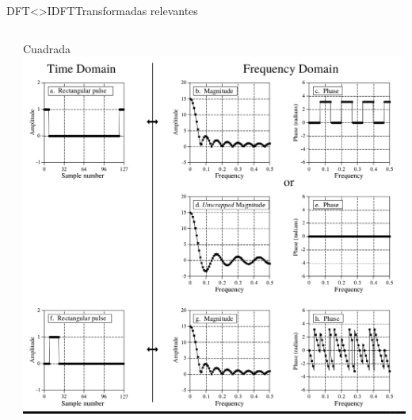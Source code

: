 \begin{frame}{DFT<>IDFT}{Transformadas relevantes}
\begin{columns}[c]
\begin{column}{.33\textwidth}
      \end{column}
      \begin{column}{.33\textwidth}
         Cuadrada
         \centering\includegraphics[width=1.0\textwidth]{3_clase/equivalencias_cuadrada}
      \end{column}
   \end{columns}
   \vfill
\end{frame}
